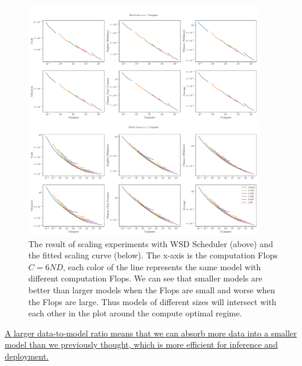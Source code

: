 \begin{figure}[!t]
    \centering
    \includegraphics[width=0.92\textwidth]{Fig/lossvscompute_fitted_and_real.pdf}
    \caption{The result of scaling experiments with WSD Scheduler (above) and the fitted scaling curve (below). The x-axis is the computation Flops $C =6ND$, each color of the line represents the same model with different computation Flops. We can see that smaller models are better than larger models when the Flops are small and worse when the Flops are large. Thus models of different sizes will intersect with each other in the plot around the compute optimal regime.}
    \label{fig:wsd_optimalscalinglaw}
\end{figure}

\uline{A larger data-to-model ratio means that we can absorb more data into a smaller model than we previously thought, which is more efficient for inference and deployment.}